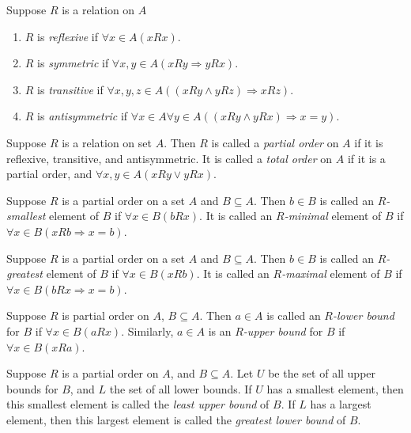 \documentclass[nobib,notoc]{tufte-handout}
\begin{document}
\begin{defi}
	Suppose \(R\) is a relation on \(A\)
	\begin{enumerate}
		\item \(R\) is \emph{reflexive} if \(\forall x\in A(xRx)\).
		\item \(R\) is \emph{symmetric} if \(\forall x,y\in A(xRy\Rightarrow yRx)\).
		\item \(R\) is \emph{transitive} if \(\forall x,y,z\in A((xRy\wedge yRz)\Rightarrow xRz)\).
		\item \(R\) is \emph{antisymmetric} if \(\forall x\in A\forall y\in A((xRy\wedge yRx)\Rightarrow x=y)\).
	\end{enumerate}
\end{defi}
\begin{defi}
	Suppose \(R\) is a relation on set \(A\). Then \(R\) is called a \emph{partial order} on \(A\) if it is reflexive, transitive, and antisymmetric. It is called a \emph{total order} on \(A\) if it is a partial order, and \(\forall x,y\in A(xRy\vee yRx)\).
\end{defi}
\begin{defi}
	Suppose \(R\) is a partial order on a set \(A\) and \(B\subseteq A\). Then \(b\in B\) is called an \(R\)\emph{-smallest} element of \(B\) if \(\forall x\in B(bRx)\). It is called an \(R\)\emph{-minimal} element of \(B\) if \(\forall x\in B(xRb\Rightarrow x=b)\).
\end{defi}
\begin{defi}
	Suppose \(R\) is a partial order on a set \(A\) and \(B\subseteq A\). Then \(b\in B\) is called an \(R\)\emph{-greatest} element of \(B\) if \(\forall x\in B(xRb)\). It is called an \(R\)\emph{-maximal} element of \(B\) if \(\forall x\in B(bRx\Rightarrow x=b)\).
\end{defi}
\begin{defi}
	Suppose \(R\) is partial order on \(A\), \(B\subseteq A\). Then \(a\in A\) is called an \(R\)\emph{-lower bound} for \(B\) if \(\forall x\in B(aRx)\). Similarly, \(a\in A\) is an \(R\)\emph{-upper bound} for \(B\) if \(\forall x\in B(xRa)\).
\end{defi}
\begin{defi}[l.u.b and g.l.b]
	Suppose \(R\) is a partial order on \(A\), and \(B\subseteq A\). Let \(U\) be the set of all upper bounds for \(B\), and \(L\) the set of all lower bounds. If \(U\) has a smallest element, then this smallest element is called the \emph{least upper bound} of \(B\). If \(L\) has a largest element, then this largest element is called the \emph{greatest lower bound} of \(B\).
\end{defi}
\end{document}
